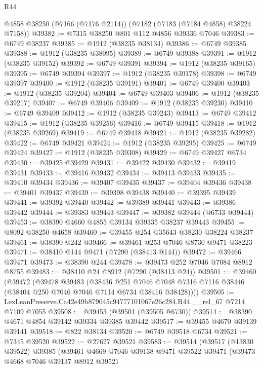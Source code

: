 \begin{lexlean}{R44}
\begin{coremodule}
{    @4858
    @38250
    (@7166 (@7176 @2114))
    (@7182 (@7183 (@7184 @4858) @38224 @7158))
@39382 := @7315 @38250 @801 @112 @4856 @39336 @7046
@39383 := @6749 @38237
@39385 := @1912 (@38235 @38134)
@39386 := @6749 @39385
@39388 := @1912 (@38235 @38095)
@39389 := @6749 @39388
@39391 := @1912 (@38235 @39152)
@39392 := @6749 @39391
@39394 := @1912 (@38235 @39165)
@39395 := @6749 @39394
@39397 := @1912 (@38235 @39178)
@39398 := @6749 @39397
@39400 := @1912 (@38235 @39191)
@39401 := @6749 @39400
@39403 := @1912 (@38235 @39204)
@39404 := @6749 @39403
@39406 := @1912 (@38235 @39217)
@39407 := @6749 @39406
@39409 := @1912 (@38235 @39230)
@39410 := @6749 @39409
@39412 := @1912 (@38235 @39243)
@39413 := @6749 @39412
@39415 := @1912 (@38235 @39256)
@39416 := @6749 @39415
@39418 := @1912 (@38235 @39269)
@39419 := @6749 @39418
@39421 := @1912 (@38235 @39282)
@39422 := @6749 @39421
@39424 := @1912 (@38235 @39295)
@39425 := @6749 @39424
@39427 := @1912 (@38235 @39308)
@39429 := @6749 @39427 @6734
@39430 := @39425 @39429
@39431 := @39422 @39430
@39432 := @39419 @39431
@39433 := @39416 @39432
@39434 := @39413 @39433
@39435 := @39410 @39434
@39436 := @39407 @39435
@39437 := @39404 @39436
@39438 := @39401 @39437
@39439 := @39398 @39438
@39440 := @39395 @39439
@39441 := @39392 @39440
@39442 := @39389 @39441
@39443 := @39386 @39442
@39444 := @39383 @39443
@39447 := @39382 @39444 (@6733 @39444)
@39453 := @38390 @4660 @4855 @39134 @39335 @38237 @39443
@39455 := @8092 @38250 @4658
@39460 := @39455 @254 @35643 @38230 @38224 @38237
@39461 := @38390 @242
@39466 := @39461 @253 @7046 @8730 @9471 @38223
@39471 := @38410 @144 @9471 (@7290 (@38413 @144))
@39472 := @39466 @39471
@39473 := @38390 @244
@39478 := @39473 @252 @7046 @7084 @8912 @8755
@39483 := @38410 @24 @8912 (@7290 (@38413 @24))
@39501 := @39460
    (@39472
      (@39478
        @39483
        (@38436
          @251
          @7046
          @7048
          @7316
          @7116
          @38446
          (@38404 @250 @7046 @7046 @7114 @6734 @38416 @38428))))
@39505 := LexLeanPreserve.Ca42e49b879045c94777101067e26c284.R44.__rel_67 @7214 @7109 @7055
@39508 := @39453 (@39501 (@39505 @6730))
@39514 := @38390 @4671 @4854 @39142 @39334 @39385 @39442
@39517 := @39455 @4670 @39139 @39141
@39518 := @822 @38134
@39520 := @6749 @39518 @6734
@39521 := @7345 @39520
@39522 := @27627 @39521
@39583 := @39514
    (@39517
      (@13830 @39522)
      @39385
      (@39461
        @4669
        @7046
        @39138
        @9471
        @39522
        @39471
        (@39473
          @4668
          @7046
          @39137
          @8912
          @39521
}
\end{coremodule}
\end{lexlean}
